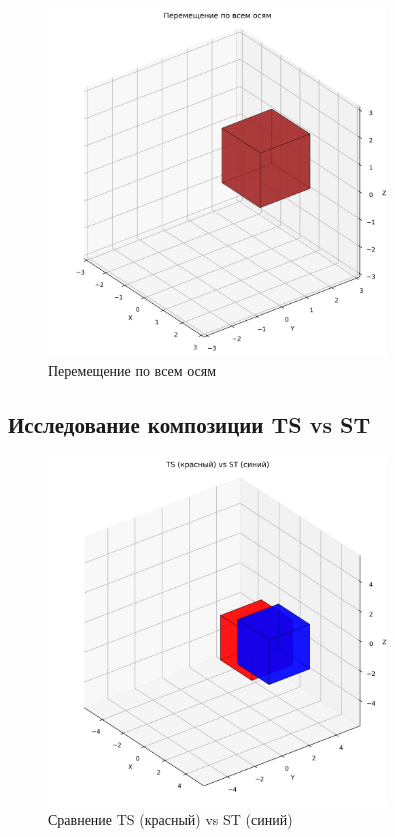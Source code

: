 \begin{figure}[H]
\centering
\includegraphics[width=0.8\textwidth]{images/task3/translate_xyz.png}
\caption{Перемещение по всем осям}
\end{figure}

\subsection*{Исследование композиции TS vs ST}

\begin{figure}[H]
\centering
\includegraphics[width=0.8\textwidth]{images/task3/ts_vs_st.png}
\caption{Сравнение TS (красный) vs ST (синий)}
\end{figure}

